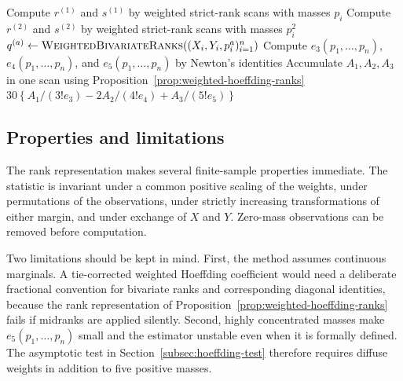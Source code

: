 \begin{algorithm}[ht]
  \caption{Fast weighted Hoeffding estimator}
  \label{alg:weighted-hoeffding}
  \small
  \begin{algorithmic}[1]
      \State Compute $r^{(1)}$ and $s^{(1)}$ by weighted strict-rank scans
        with masses $p_i$
      \State Compute $r^{(2)}$ and $s^{(2)}$ by weighted strict-rank scans
        with masses $p_i^2$
        \State $q^{(a)}\gets
          \Call{WeightedBivariateRanks}{(X_i,Y_i,p_i^a)_{i=1}^n}$
      \EndFor
      \State Compute $e_3(p_1,\ldots,p_n)$, $e_4(p_1,\ldots,p_n)$, and
        $e_5(p_1,\ldots,p_n)$ by Newton's identities
      \State Accumulate $A_1,A_2,A_3$ in one scan using
        Proposition~\ref{prop:weighted-hoeffding-ranks}
      \State \Return
        $30\left\{A_1/(3!e_3)-2A_2/(4!e_4)+A_3/(5!e_5)\right\}$
    \EndProcedure
  \end{algorithmic}
\end{algorithm}

\subsection{Properties and limitations}

The rank representation makes several finite-sample properties immediate. The
statistic is invariant under a common positive scaling of the weights, under
permutations of the observations, under strictly increasing transformations
of either margin, and under exchange of $X$ and $Y$. Zero-mass observations
can be removed before computation.

Two limitations should be kept in mind. First, the method assumes continuous
marginals. A tie-corrected weighted Hoeffding coefficient would need a
deliberate fractional convention for bivariate ranks and corresponding
diagonal identities, because the rank representation of
Proposition~\ref{prop:weighted-hoeffding-ranks} fails if midranks are applied
silently. Second, highly concentrated
masses make $e_5(p_1,\ldots,p_n)$ small and the estimator unstable even when
it is formally defined. The asymptotic test in
Section~\ref{subsec:hoeffding-test} therefore requires diffuse weights in
addition to five positive masses.
